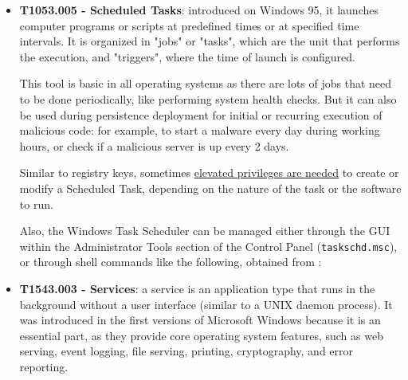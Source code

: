 \begin{itemize}
\pagebreak
\item \textbf{T1053.005 - Scheduled Tasks}: introduced on Windows 95, it launches computer programs or scripts at predefined times or at specified time intervals. It is organized in "jobs" or "tasks", which are the unit that performs the execution, and "triggers", where the time of launch is configured.

This tool is basic in all operating systems as there are lots of jobs that need to be done periodically, like performing system health checks. But it can also be used during persistence deployment for initial or recurring execution of malicious code: for example, to start a malware every day during working hours, or check if a malicious server is up every 2 days. 

Similar to registry keys, sometimes \underline{elevated privileges are needed} to create or modify a Scheduled Task, depending on the nature of the task or the software to run.

Also, the Windows Task Scheduler can be managed either through the GUI within the Administrator Tools section of the Control Panel (\texttt{taskschd.msc}), or through shell commands like the following, obtained from \cite{PayloadAllTheThings}:
\vspace{7pt}

\pagebreak
\item \textbf{T1543.003 - Services}: a service\cite{WindowsServices} is an application type that runs in the background without a user interface (similar to a UNIX daemon process). It was introduced in the first versions of Microsoft Windows because it is an essential part, as they provide core operating system features, such as web serving, event logging, file serving, printing, cryptography, and error reporting.


\end{itemize}
